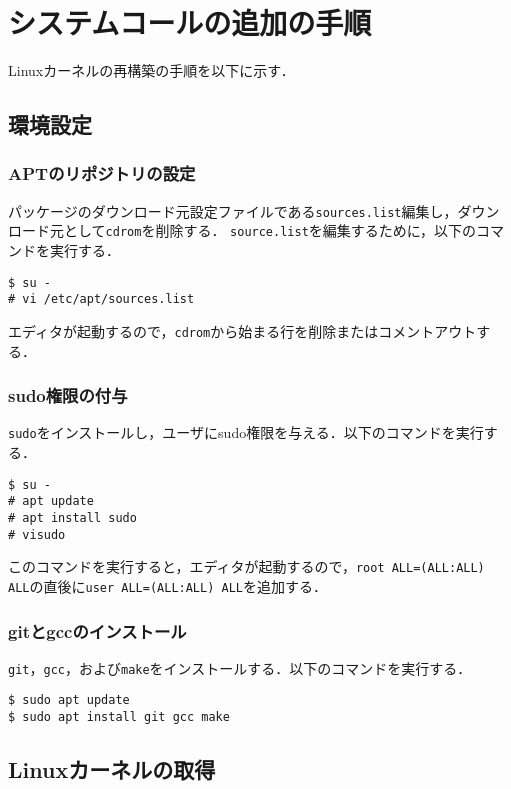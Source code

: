 \documentclass[12pt]{jsarticle}
\begin{document}
\section{システムコールの追加の手順}
Linuxカーネルの再構築の手順を以下に示す．
\subsection{環境設定}
\subsubsection{APTのリポジトリの設定}
パッケージのダウンロード元設定ファイルである\verb|sources.list|編集し，ダウンロード元として\verb|cdrom|を削除する．
\verb|source.list|を編集するために，以下のコマンドを実行する．
\begin{verbatim}
$ su -
# vi /etc/apt/sources.list
\end{verbatim}
エディタが起動するので，\verb|cdrom|から始まる行を削除またはコメントアウトする．
\subsubsection{sudo権限の付与}
\verb|sudo|をインストールし，ユーザにsudo権限を与える．以下のコマンドを実行する．
\begin{verbatim}
$ su -
# apt update
# apt install sudo 
# visudo
\end{verbatim}
このコマンドを実行すると，エディタが起動するので，\verb|root ALL=(ALL:ALL) ALL|の直後に\verb|user ALL=(ALL:ALL) ALL|を追加する．
\subsubsection{gitとgccのインストール}
\verb|git|，\verb|gcc|，および\verb|make|をインストールする．以下のコマンドを実行する．
\begin{verbatim}
$ sudo apt update
$ sudo apt install git gcc make
\end{verbatim}

\subsection{Linuxカーネルの取得}
\end{document}
